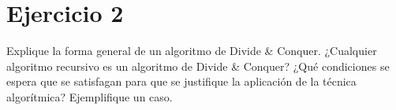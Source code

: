 \documentclass[10pt,a4paper]{article}
\begin{document}
\section{Ejercicio 2}

Explique la forma general de un algoritmo de Divide \& Conquer. ¿Cualquier algoritmo recursivo es un algoritmo de Divide \& Conquer? ¿Qué condiciones se espera que se satisfagan para que se justifique la aplicación de la técnica algorítmica? Ejemplifique un caso.
\newpage
\end{document}
